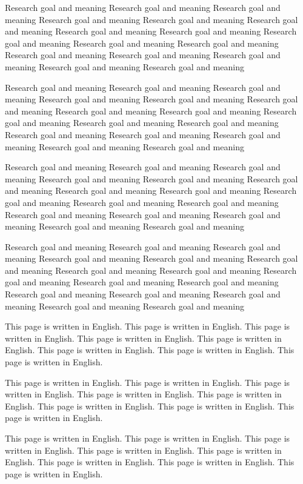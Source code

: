 \documentclass[12pt]{article} %
\begin{document}
Research goal and meaning Research goal and meaning Research goal and meaning Research goal and meaning
Research goal and meaning Research goal and meaning Research goal and meaning Research goal and meaning
Research goal and meaning Research goal and meaning Research goal and meaning Research goal and meaning
Research goal and meaning Research goal and meaning Research goal and meaning Research goal and meaning

Research goal and meaning Research goal and meaning Research goal and meaning Research goal and meaning
Research goal and meaning Research goal and meaning Research goal and meaning Research goal and meaning
Research goal and meaning Research goal and meaning Research goal and meaning Research goal and meaning
Research goal and meaning Research goal and meaning Research goal and meaning Research goal and meaning

Research goal and meaning Research goal and meaning Research goal and meaning Research goal and meaning
Research goal and meaning Research goal and meaning Research goal and meaning Research goal and meaning
Research goal and meaning Research goal and meaning Research goal and meaning Research goal and meaning
Research goal and meaning Research goal and meaning Research goal and meaning Research goal and meaning

Research goal and meaning Research goal and meaning Research goal and meaning Research goal and meaning
Research goal and meaning Research goal and meaning Research goal and meaning Research goal and meaning
Research goal and meaning Research goal and meaning Research goal and meaning Research goal and meaning
Research goal and meaning Research goal and meaning Research goal and meaning Research goal and meaning


\newpage

This page is written in English. This page is written in English. 
This page is written in English. This page is written in English. 
This page is written in English. This page is written in English. 
This page is written in English. This page is written in English. 

This page is written in English. This page is written in English. 
This page is written in English. This page is written in English. 
This page is written in English. This page is written in English. 
This page is written in English. This page is written in English. 

This page is written in English. This page is written in English. 
This page is written in English. This page is written in English. 
This page is written in English. This page is written in English. 
This page is written in English. This page is written in English. 
\end{document}
